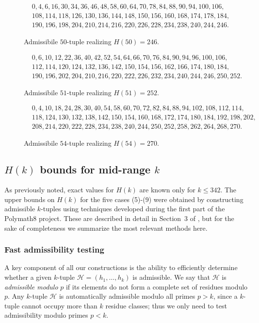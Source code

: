 \begin{figure}
\begin{align*}
&0,4,6,16,30,34,36,46,48,58,60,64,70,78,84,88,90,94,100,106,\\
&108,114,118,126,130,136,144,148,150,156,160,168,174,178,184,\\
&190,196,198,204,210,214,216,220,226,228,234,238,240,244,246.
\end{align*}
\caption{Admissibile $50$-tuple realizing $H(50)=246$.}\label{k50tup}
\end{figure}


\begin{figure}
\begin{align*}
&0,6,10,12,22,36,40,42,52,54,64,66,70,76,84,90,94,96,100,106,\\
&112,114,120,124,132,136,142,150,154,156,162,166,174,180,184,\\
&190,196,202,204,210,216,220,222,226,232,234,240,244,246,250,252.
\end{align*}
\caption{Admissibile $51$-tuple realizing $H(51)=252$.}\label{k51tup}
\end{figure}
\begin{figure}

\begin{align*}
&0,4,10,18,24,28,30,40,54,58,60,70,72,82,84,88,94,102,108,112,114,\\
&118,124,130,132,138,142,150,154,160,168,172,174,180,184,192,198,202,\\
&208,214,220,222,228,234,238,240,244,250,252,258,262,264,268,270.
\end{align*}
\caption{Admissibile $54$-tuple realizing $H(54)=270$.}\label{k54tup}
\end{figure}

\subsection{\texorpdfstring{$H(k)$}{H(k)} bounds for mid-range \texorpdfstring{$k$}{k}}\label{secmidk}

As previously noted, exact values for $H(k)$ are known only for $k\le 342$.
The upper bounds on $H(k)$ for the five cases (5)-(9) were obtained by constructing admissible $k$-tuples using techniques developed during the first part of the Polymath8 project.
These are described in detail in Section~3 of \cite{polymath8a-unabridged}, but for the sake of completeness we summarize the most relevant methods here.

\subsubsection{Fast admissibility testing}
A key component of all our constructions is the ability to efficiently determine whether a given $k$-tuple $\mathcal{H}=(h_1,\ldots, h_k)$ is admissible.  We say that $\mathcal{H}$ is \emph{admissible modulo} $p$ if its elements do not form a complete set of residues modulo $p$.
Any $k$-tuple $\mathcal{H}$ is automatically admissible modulo all primes $p > k$, since a $k$-tuple cannot occupy more than $k$ residue classes; thus we only need to test admissibility modulo primes $p < k$.

